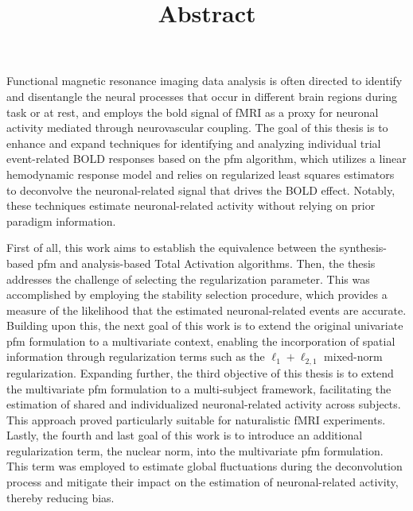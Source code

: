 \title{Abstract}

Functional magnetic resonance imaging data analysis is often directed to
identify and disentangle the neural processes that occur in different brain
regions during task or at rest, and employs the \acrfull*{bold} signal of fMRI
as a proxy for neuronal activity mediated through neurovascular coupling. The
goal of this thesis is to enhance and expand techniques for identifying and
analyzing individual trial event-related BOLD responses based on the
\acrfull*{pfm} algorithm, which utilizes a linear hemodynamic response model and
relies on regularized least squares estimators to deconvolve the
neuronal-related signal that drives the BOLD effect. Notably, these techniques
estimate neuronal-related activity without relying on prior paradigm
information.

First of all, this work aims to establish the equivalence between the
synthesis-based \acrshort*{pfm} and analysis-based Total Activation algorithms.
Then, the thesis addresses the challenge of selecting the regularization
parameter. This was accomplished by employing the stability selection procedure,
which provides a measure of the likelihood that the estimated neuronal-related
events are accurate. Building upon this, the next goal of this work is to extend
the original univariate \acrshort*{pfm} formulation to a multivariate context,
enabling the incorporation of spatial information through regularization terms
such as the $\ell_1 + \ell_{2,1}$ mixed-norm regularization. Expanding further,
the third objective of this thesis is to extend the multivariate \acrshort*{pfm}
formulation to a multi-subject framework, facilitating the estimation of shared
and individualized neuronal-related activity across subjects. This approach
proved particularly suitable for naturalistic fMRI experiments. Lastly, the
fourth and last goal of this work is to introduce an additional regularization
term, the nuclear norm, into the multivariate \acrshort*{pfm} formulation. This
term was employed to estimate global fluctuations during the deconvolution
process and mitigate their impact on the estimation of neuronal-related
activity, thereby reducing bias.

